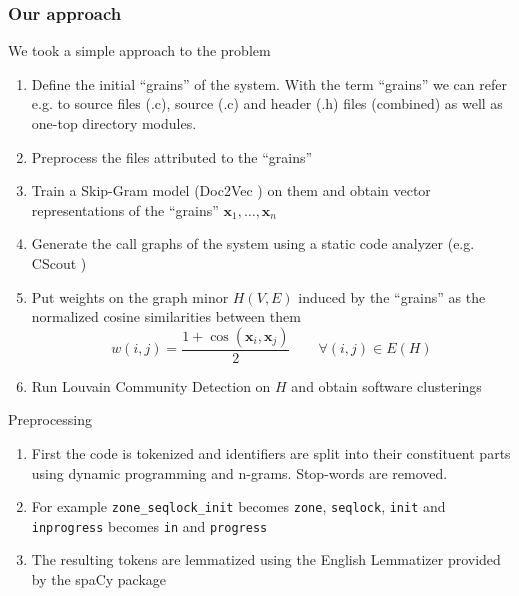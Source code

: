 \documentclass{beamer}
\renewcommand{\vec}{\mathbf}
\begin{document}
\begin{frame}[allowframebreaks]
\frametitle{Our approach}

We took a simple approach to the problem
\begin{enumerate}
    \item Define the initial ``grains'' of the system. With the term ``grains'' we can refer e.g. to source files (.c), source (.c) and header (.h) files (combined) as well as one-top directory modules. 
    \item Preprocess the files attributed to the ``grains''
    \item Train a Skip-Gram model (Doc2Vec \cite{doc2vec}) on them and obtain vector representations of the ``grains'' $\vec x_1, \dots, \vec x_n$
    \item Generate the call graphs of the system using a static code analyzer (e.g. CScout \cite{cscout})
    
    \framebreak
    \item Put weights on the graph minor $H(V, E)$ induced by the ``grains'' as the normalized cosine similarities between them $$w(i, j) = \frac {1 + \cos(\vec x_i, \vec x_j)} 2 \qquad \forall (i, j) \in E(H)$$
    
    \item Run Louvain Community Detection on $H$ and obtain software clusterings
\end{enumerate}
    
\end{frame}

\begin{frame}{Preprocessing}

\begin{enumerate}
    \item<1-> First the code is tokenized and identifiers are split into their constituent parts using dynamic programming and n-grams. Stop-words are removed. 
    
    \item<2-> For example \texttt{zone\_seqlock\_init} becomes \texttt{zone}, \texttt{seqlock}, \texttt{init} and \texttt{inprogress} becomes \texttt{in} and \texttt{progress}
    

	

	\item<3-> The resulting tokens are lemmatized using the English Lemmatizer provided by the spaCy \cite{spacy} package

\end{enumerate}



\end{frame}
\end{document}
